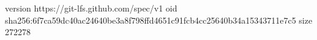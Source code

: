 version https://git-lfs.github.com/spec/v1
oid sha256:6f7ca59dc40ac24640be3a8f798ffd4651c91fcb4cc25640b34a15343711e7c5
size 272278
